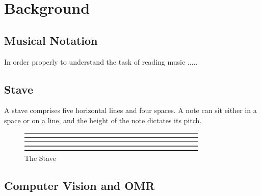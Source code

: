 \section{Background}
    \subsection{Musical Notation}
        In order properly to understand the task of reading music .....
        \subsection{Stave}
            A stave comprises five horizontal lines and four spaces. A note can sit either in a space or on a line, and the height of the note dictates its pitch.
            \begin{figure}[ht!]
            \centering
            \includegraphics[width=90mm]{./assets/staff.png}
            \caption{The Stave}
            \label{stave}
            \end{figure}


    \subsection{Computer Vision and OMR}
